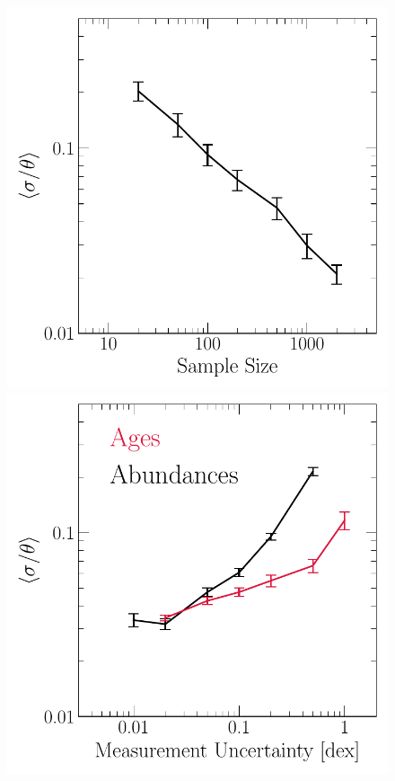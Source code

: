\documentclass[ms.tex]{subfiles}
\begin{document}
\begin{figure}
\centering
\includegraphics[scale = 0.45]{precision_samplesize.pdf}
\includegraphics[scale = 0.45]{precision_uncertainty.pdf}

\end{figure}
\end{document}
